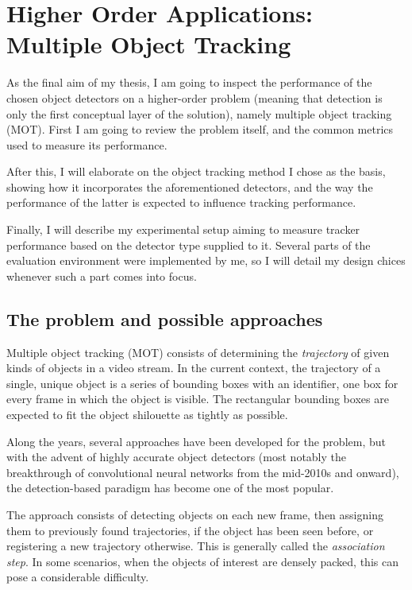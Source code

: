 \chapter{Higher Order Applications: Multiple Object Tracking}

As the final aim of my thesis, I am going to inspect the performance of the chosen object detectors on a higher-order problem (meaning that detection is only the first conceptual layer of the solution), namely multiple object tracking (MOT). First I am going to review the problem itself, and the common metrics used to measure its performance. 

After this, I will elaborate on the object tracking method I chose as the basis, showing how it incorporates the aforementioned detectors, and the way the performance of the latter is expected to influence tracking performance.

Finally, I will describe my experimental setup aiming to measure tracker performance based on the detector type supplied to it. Several parts of the evaluation environment were implemented by me, so I will detail my design chices whenever such a part comes into focus.

\section{The problem and possible approaches}

Multiple object tracking (MOT) consists of determining the \textit{trajectory} of given kinds of objects in a video stream. In the current context, the trajectory of a single, unique object is a series of bounding boxes with an identifier, one box for every frame in which the object is visible. The rectangular bounding boxes are expected to fit the object shilouette as tightly as possible.

Along the years, several approaches have been developed for the problem, but with the advent of highly accurate object detectors (most notably the breakthrough of convolutional neural networks from the mid-2010s and onward), the detection-based paradigm has become one of the most popular.

The approach consists of detecting objects on each new frame, then assigning them to previously found trajectories, if the object has been seen before, or registering a new trajectory otherwise. This is generally called the \textit{association step}. In some scenarios, when the objects of interest are densely packed, this can pose a considerable difficulty.

